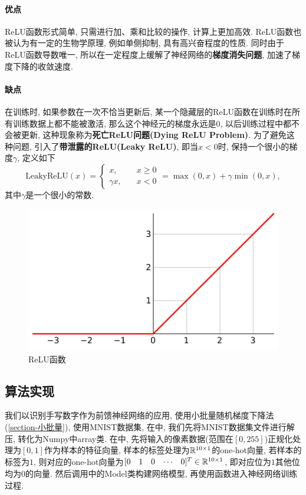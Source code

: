 \documentclass[12pt, a4paper, oneside]{ctexart}
\begin{document}
\paragraph{优点} ReLU函数形式简单, 只需进行加、乘和比较的操作, 计算上更加高效. ReLU函数也被认为有一定的生物学原理\cite{ref-ReLU}, 例如单侧抑制, 具有高兴奋程度的性质. 同时由于ReLU函数导数唯一, 所以在一定程度上缓解了神经网络的\textbf{梯度消失问题}, 加速了梯度下降的收敛速度.

\paragraph{缺点} 在训练时, 如果参数在一次不恰当更新后, 某一个隐藏层的ReLU函数在训练时在所有训练数据上都不能被激活, 那么这个神经元的梯度永远是0, 以后训练过程中都不会被更新, 这种现象称为\textbf{死亡ReLU问题(Dying ReLU Problem)}. 为了避免这种问题, 引入了\textbf{带泄露的ReLU(Leaky ReLU)}, 即当$x<0$时, 保持一个很小的梯度$\gamma$, 定义如下
\begin{equation}
    \text{LeakyReLU}(x) = \begin{cases}
        x,&\quad x \geqslant 0\\
        \gamma x,&\quad x < 0
    \end{cases} = \max(0, x) + \gamma\min(0, x),
\end{equation}
其中$\gamma$是一个很小的常数.
\begin{figure}[htbp]
    \centering
    \includegraphics[scale=0.5]{Ramp_function.pdf}
    \caption{ReLU函数\protect\footnotemark[1]}
    \label{figure-Ramp}
\end{figure}

\subsection{算法实现}
我们以识别手写数字作为前馈神经网络的应用, 使用小批量随机梯度下降法(\ref{section-小批量}), 使用MNIST数据集, 在中, 我们先将MNIST数据集文件进行解压, 转化为Numpy中array类. 在中, 先将输入的像素数据(范围在$[0, 255]$)正规化处理为$[0,1]$作为样本的特征向量, 样本的标签处理为$\mathbb{R}^{10\times 1}$的one-hot向量, 若样本的标签为$1$, 则对应的one-hot向量为$[\begin{matrix}
    0&1&0&\cdots&0
\end{matrix}]^T\in \mathbb{R}^{10\times 1}$, 即对应位为$1$其他位均为$0$的向量. 然后调用中的Model类构建网络模型, 再使用函数进入神经网络训练过程.
\end{document}
